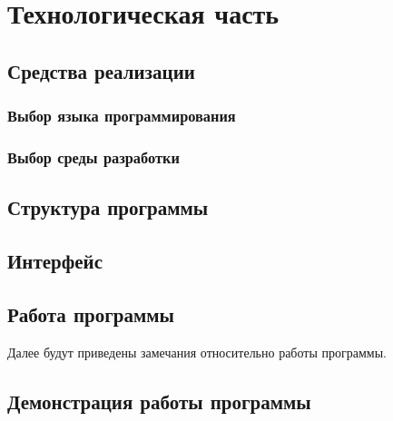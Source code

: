 \section{Технологическая часть}

\subsection{Средства реализации}

\subsubsection{Выбор языка программирования}

\subsubsection{Выбор среды разработки}


\subsection{Структура программы}

\subsection{Интерфейс}

\subsection{Работа программы}

Далее будут приведены замечания относительно работы программы.


\subsection{Демонстрация работы программы}
